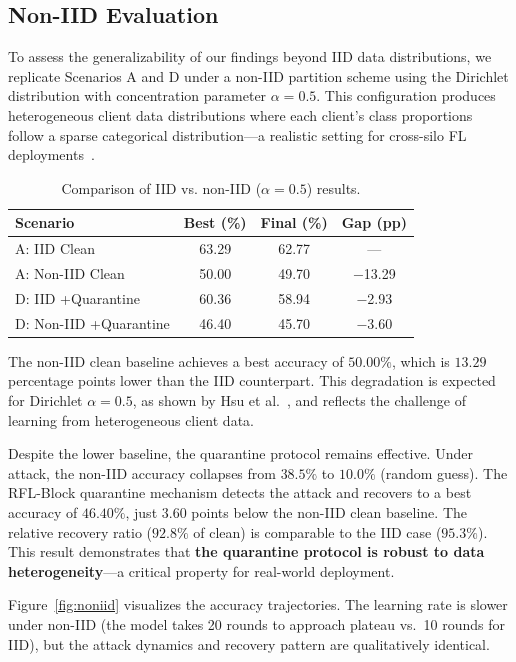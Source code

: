 \documentclass[conference]{IEEEtran}
\begin{document}
\subsection{Non-IID Evaluation}
\label{sec:noniid}
To assess the generalizability of our findings beyond IID data distributions, we replicate Scenarios A and D under a non-IID partition scheme using the Dirichlet distribution with concentration parameter $\alpha = 0.5$. This configuration produces heterogeneous client data distributions where each client's class proportions follow a sparse categorical distribution---a realistic setting for cross-silo FL deployments~\cite{hsu2019nonIID}.

\begin{table}[t]
\centering
\caption{Comparison of IID vs. non-IID ($\alpha = 0.5$) results.}
\label{tab:noniid}
\vspace{-3pt}
\begin{tabular}{lccc}
\toprule
\textbf{Scenario} & \textbf{Best (\%)} & \textbf{Final (\%)} & \textbf{Gap (pp)} \\
\midrule
A: IID Clean & 63.29 & 62.77 & --- \\
A: Non-IID Clean & 50.00 & 49.70 & $-$13.29 \\
D: IID +Quarantine & 60.36 & 58.94 & $-$2.93 \\
D: Non-IID +Quarantine & 46.40 & 45.70 & $-$3.60 \\
\bottomrule
\end{tabular}
\end{table}

The non-IID clean baseline achieves a best accuracy of $50.00\%$, which is $13.29$ percentage points lower than the IID counterpart. This degradation is expected for Dirichlet $\alpha = 0.5$, as shown by Hsu et al.~\cite{hsu2019nonIID}, and reflects the challenge of learning from heterogeneous client data.

Despite the lower baseline, the quarantine protocol remains effective. Under attack, the non-IID accuracy collapses from $38.5\%$ to $10.0\%$ (random guess). The RFL-Block quarantine mechanism detects the attack and recovers to a best accuracy of $46.40\%$, just $3.60$ points below the non-IID clean baseline. The relative recovery ratio ($92.8\%$ of clean) is comparable to the IID case ($95.3\%$). This result demonstrates that \textbf{the quarantine protocol is robust to data heterogeneity}---a critical property for real-world deployment.

Figure~\ref{fig:noniid} visualizes the accuracy trajectories. The learning rate is slower under non-IID (the model takes 20 rounds to approach plateau vs.~10 rounds for IID), but the attack dynamics and recovery pattern are qualitatively identical.
\end{document}
